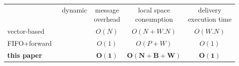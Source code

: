 \newcommand{\cmark}{\ding{51}}%
\newcommand{\xmark}{\ding{55}}%

\setlength{\tabcolsep}{3pt} %

\begin{tabularx}{0.98\columnwidth}{@{}Xcccc@{}}
  & dynamic & \makecell{message\\overhead} & \makecell{local space\\consumption} &  \makecell{delivery\\execution time} \\ \cmidrule{2-5}
  vector-based~\cite{schwarz1994detecting} & \cmark & $O(N)$ & $O(N+W.N)$ & $O(W.N)$ \\
  FIFO+forward~\cite{friedman2004causal} & \xmark & $O(1)$ & $O(P+ W)$ & $O(1)$ \\ \hline\hline
  \textbf{this paper} & \textbf{\cmark} & $\mathbf{O(1)}$ & $\mathbf{O(N+B+W)}$ & $\mathbf{O(1)}$ \\ 
\end{tabularx}

